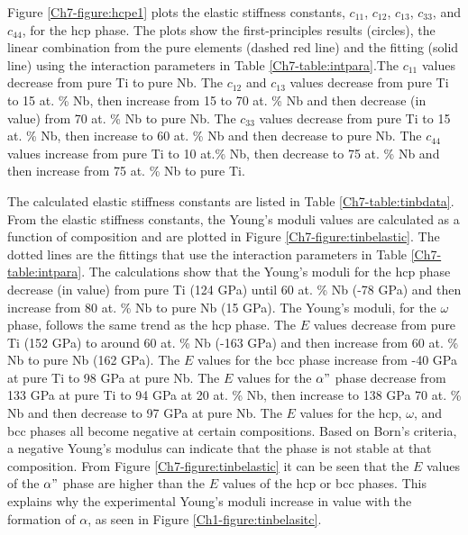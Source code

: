 Figure \ref{Ch7-figure:hcpe1} plots the elastic stiffness constants, $c_{11}$, $c_{12}$, $c_{13}$, $c_{33}$, and $c_{44}$, for the hcp phase. The plots show the first-principles results (circles), the linear combination from the pure elements (dashed red line) and the fitting (solid line) using the interaction parameters in Table \ref{Ch7-table:intpara}.The $c_{11}$ values decrease from pure Ti to pure Nb. The $c_{12}$ and $c_{13}$ values decrease from pure Ti to 15 at. \% Nb, then increase from 15 to 70 at. \% Nb and then decrease (in value) from 70 at. \% Nb to pure Nb. The $c_{33}$ values decrease from pure Ti to 15 at. \% Nb, then increase to 60 at. \% Nb and then decrease to pure Nb. The $c_{44}$ values increase from pure Ti to 10 at.\% Nb, then decrease to 75 at. \% Nb and then increase from 75 at. \% Nb to pure Ti.

The calculated elastic stiffness constants are listed in Table \ref{Ch7-table:tinbdata}. From the elastic stiffness constants, the Young's moduli values are calculated as a function of composition and are plotted in Figure \ref{Ch7-figure:tinbelastic}. The dotted lines are the fittings that use the interaction parameters in Table \ref{Ch7-table:intpara}. The calculations show that the Young's moduli for the hcp phase decrease (in value) from pure Ti (124 GPa) until 60 at. \% Nb (-78 GPa) and then increase from 80 at. \% Nb to pure Nb (15 GPa). The Young's moduli, for the $\omega$ phase, follows the same trend as the hcp phase. The $E$ values decrease from pure Ti (152 GPa) to around 60 at. \% Nb (-163 GPa) and then increase from 60 at. \% Nb to pure Nb (162 GPa). The $E$ values for the bcc phase increase from -40 GPa at pure Ti to 98 GPa at pure Nb. The $E$ values for the $\alpha"$ phase decrease from 133 GPa at pure Ti to 94 GPa at 20 at. \% Nb, then increase to 138 GPa 70 at. \% Nb and then decrease to 97 GPa at pure Nb. The $E$ values for the hcp, $\omega$, and bcc phases all become negative at certain compositions. Based on Born's criteria, a negative Young's modulus can indicate that the phase is not stable at that composition. From Figure \ref{Ch7-figure:tinbelastic} it can be seen that the $E$ values of the $\alpha"$ phase are higher than the $E$ values of the hcp or bcc phases. This explains why the experimental Young's moduli increase in value with the formation of $\alpha$, as seen in Figure \ref{Ch1-figure:tinbelasitc}. 

